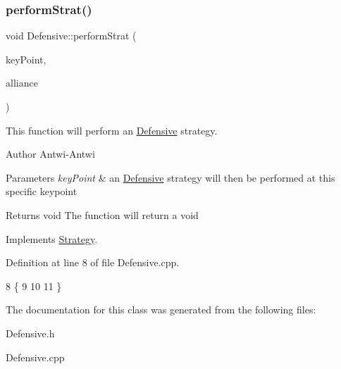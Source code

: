 \subsubsection{\texorpdfstring{perform\+Strat()}{performStrat()}}
{\footnotesize\ttfamily void Defensive\+::perform\+Strat (\begin{DoxyParamCaption}\item[{\hyperlink{classKeyPoint}{Key\+Point} $\ast$}]{key\+Point,  }\item[{\hyperlink{classAlliance}{Alliance} $\ast$}]{alliance }\end{DoxyParamCaption})\hspace{0.3cm}{\ttfamily [virtual]}}



This function will perform an \hyperlink{classDefensive}{Defensive} strategy. 

\begin{DoxyAuthor}{Author}
Antwi-\/\+Antwi
\end{DoxyAuthor}

\begin{DoxyParams}{Parameters}
{\em key\+Point} & an \hyperlink{classDefensive}{Defensive} strategy will then be performed at this specific keypoint\\
\hline
\end{DoxyParams}
\begin{DoxyReturn}{Returns}
void The function will return a void 
\end{DoxyReturn}


Implements \hyperlink{classStrategy_aa0692005cb67d0ee2441046f6b302e7d}{Strategy}.



Definition at line 8 of file Defensive.\+cpp.


\begin{DoxyCode}
8                                                                    \{
9     
10     
11 \}
\end{DoxyCode}


The documentation for this class was generated from the following files\+:\begin{DoxyCompactItemize}
\item 
Defensive.\+h\item 
Defensive.\+cpp\end{DoxyCompactItemize}
